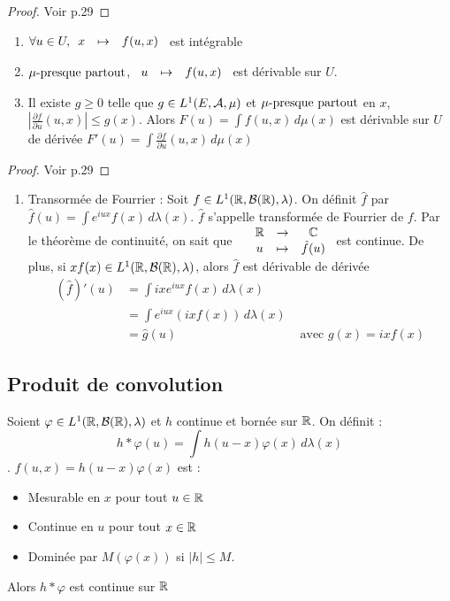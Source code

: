 \documentclass[]{report}
\begin{document}
\begin{proof}
    Voir p.29
\end{proof}

\begin{tm}
    \begin{enumerate}
        \item $\forall u \in U, \begin{array}{ccccc} x & \mapsto & f(u,x) \end{array}$ est intégrable
        \item $\mu\text{-presque partout}$, $\begin{array}{ccccc} u & \mapsto & f(u,x) \end{array}$ est dérivable sur $U$.
        \item Il existe $g\ge0$ telle que $g\in L^1(E,\mathcal{A},\mu)$ et $\mu\text{-presque partout}$ en $x$, $\left|\frac{\partial f}{\partial u} (u,x)\right|\le g(x)$. Alors $F(u)=\int f(u,x)\,d\mu(x)$ est dérivable sur $U$ de dérivée $F'(u)=\int \frac{\partial f}{\partial u}(u,x)\,d\mu(x)$
    \end{enumerate}
\end{tm}

\begin{proof}
    Voir p.29
\end{proof}

\begin{ex}
    \begin{enumerate}
        \item Transormée de Fourrier : Soit $f\in L^1(\mathbb{R},\mathcal{B}(\mathbb{R}),\lambda)$. On définit $\hat{f}$ par $\hat{f}(u)=\int e^{iux}f(x)\,d\lambda(x)$. $\hat{f}$ s'appelle transformée de Fourrier de $f$. Par le théorème de continuité, on sait que $\begin{array}{ccccc} & \mathbb{R} & \to & \mathbb{C} \\ & u & \mapsto & \hat{f}(u) \end{array}$ est continue. De plus, si $xf(x)\in L^1(\mathbb{R},\mathcal{B}(\mathbb{R}),\lambda)$, alors $\hat{f}$ est dérivable de dérivée
        \begin{align*}
        (\hat{f})'(u)&=\int ixe^{iux}f(x)\,d\lambda(x)&\\
        &=\int e^{iux}(ixf(x))\,d\lambda(x)&\\
        &=\hat{g}(u)&\text{ avec $g(x)=ixf(x)$}
        \end{align*}
    \end{enumerate}
\end{ex}

\subsection*{Produit de convolution}

Soient $\varphi\in L^1(\mathbb{R},\mathcal{B}(\mathbb{R}),\lambda)$ et $h$ continue et bornée sur $\mathbb{R}$. On définit : $$h\ast\varphi(u)=\int h(u-x)\varphi(x)\,d\lambda(x)$$.
$f(u,x)=h(u-x)\varphi(x)$ est :\begin{itemize}
    \item Mesurable en $x$ pour tout $u\in\mathbb{R}$
    \item Continue en $u$ pour tout $x\in \mathbb{R}$
    \item Dominée par $M(\varphi(x))$ si $|h|\le M$.
\end{itemize}
Alors $h\ast \varphi$ est continue sur $\mathbb{R}$
\end{document}
